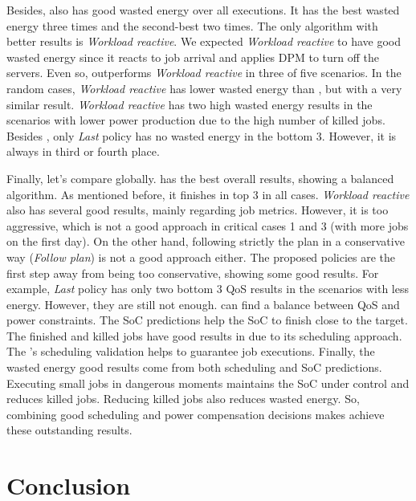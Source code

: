 Besides, \emph{\systemName} also has good wasted energy over all executions. It has the best wasted energy three times and the second-best two times. The only algorithm with better results is \emph{Workload reactive}. We expected \emph{Workload reactive} to have good wasted energy since it reacts to job arrival and applies DPM to turn off the servers. Even so, \emph{\systemName} outperforms \emph{Workload reactive} in three of five scenarios. In the random cases, \emph{Workload reactive} has lower wasted energy than \emph{\systemName}, but with a very similar result. \emph{Workload reactive} has two high wasted energy results in the scenarios with lower power production due to the high number of killed jobs. Besides \emph{\systemName}, only \emph{Last} policy has no wasted energy in the bottom 3. However, it is always in third or fourth place.

Finally, let's compare \emph{\systemName} globally. \emph{\systemName} has the best overall results, showing a balanced algorithm. As mentioned before, it finishes in top 3 in all cases. \emph{Workload reactive} also has several good results, mainly regarding job metrics. However, it is too aggressive, which is not a good approach in critical cases 1 and 3 (with more jobs on the first day). On the other hand, following strictly the plan in a conservative way (\emph{Follow plan}) is not a good approach either. The proposed policies are the first step away from being too conservative, showing some good results. For example, \emph{Last} policy has only two bottom 3 QoS results in the scenarios with less energy. However, they are still not enough. \emph{\systemName} can find a balance between QoS and power constraints. The SoC predictions help the SoC to finish close to the target. The finished and killed jobs have good results in \emph{\systemName} due to its scheduling approach. The \emph{\systemName}'s scheduling validation helps to guarantee job executions. Finally, the wasted energy good results come from both scheduling and SoC predictions. Executing small jobs in dangerous moments maintains the SoC under control and reduces killed jobs. Reducing killed jobs also reduces wasted energy. So, combining good scheduling and power compensation decisions makes \emph{\systemName} achieve these outstanding results.



\section{Conclusion}

